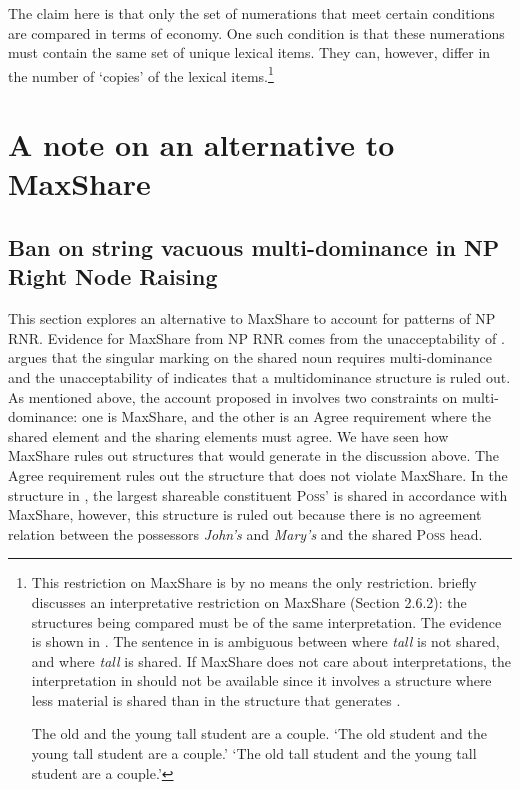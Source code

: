 \documentclass[output=paper]{langscibook}
\begin{document}
The claim here is that only the set of numerations that meet certain conditions are compared in terms of economy. One such condition is that these numerations must contain the same set of unique lexical items. They can, however, differ in the number of `copies' of the lexical items.\footnote{This restriction on MaxShare is by no means the only restriction. \cite{Shen:2018a} briefly discusses an interpretative restriction on MaxShare (Section 2.6.2):  the structures being compared must be of the same interpretation. The evidence is shown in . The sentence in  is ambiguous between  where \textit{tall} is not shared, and  where \textit{tall} is shared. If MaxShare does not care about interpretations, the interpretation in  should not be available since it involves a structure where less material is shared than in the structure that generates .

\ea 
	\label{shenftn8exi}
	The old and the young tall student are a couple.
	\ea 
		\label{shenftn8exi:a}
		`The old student and the young tall student are a couple.'
	\ex 
		\label{shenftn8exi:b}
		`The old tall student and the young tall student are a couple.'
	\z 
\z 
}


\section{A note on an alternative to MaxShare}
\label{shensect:alternatives}

\subsection{Ban on string vacuous multi-dominance in NP Right Node Raising}
\label{shensect:ban}

This section explores an alternative to MaxShare to account for patterns of NP RNR. Evidence for MaxShare from NP RNR comes from the unacceptability of . \cite{Shen:2018a} argues that the singular marking on the shared noun requires multi-dominance and the unacceptability of  indicates that a multidominance structure is ruled out. As mentioned above, the account proposed in \cite{Shen:2018a} involves two constraints on multi-dominance: one is MaxShare, and the other is an Agree requirement where the shared element and the sharing elements must agree. We have seen how MaxShare rules out structures that would generate  in the discussion above. The Agree requirement rules out the structure that does not violate MaxShare. In the structure in , the largest shareable constituent \textsc{Poss'} is shared in accordance with MaxShare, however, this structure is ruled out because there is no agreement relation between the possessors \textit{John's} and \textit{Mary's} and the shared \textsc{Poss} head.
\end{document}
